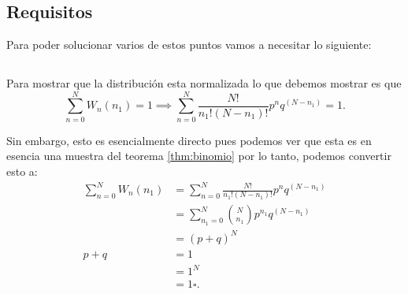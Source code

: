 \documentclass{report}
\begin{document}
\chapter{}

\section*{Requisitos}

Para poder solucionar varios de estos puntos vamos a necesitar lo siguiente:

\label{thm:binomio}


\section{}

Para mostrar que la distribución esta normalizada lo que debemos mostrar es que \[
\sum_{n=0}^{N} W_n\left( n_1 \right) = 1 \implies \sum_{n=0}^{N} \frac{N!}{n_1!\left( N - n_1 \right)!}p^{n}q^{\left( N - n_1 \right) } = 1
.\] 

Sin embargo, esto es esencialmente directo pues podemos ver que esta es en esencia una muestra del teorema \ref{thm:binomio} por lo tanto, podemos convertir esto a:
\begin{align*}
  \sum_{n=0}^{N} W_n\left( n_1 \right) &= \sum_{n=0}^{N} \frac{N!}{n_1!\left( N - n_1 \right)!}p^{n}q^{\left( N - n_1 \right) }\\
				       &= \sum_{n_1=0}^{N} {N \choose n_1} p^{n_1}q^{\left( N - n_1 \right) } \\
				       &= \left( p + q \right)^{N} \\
				       p + q &= 1 \\
				       &= 1^{N} \\
				       &= 1 \square
.\end{align*}
\section{}
\end{document}
